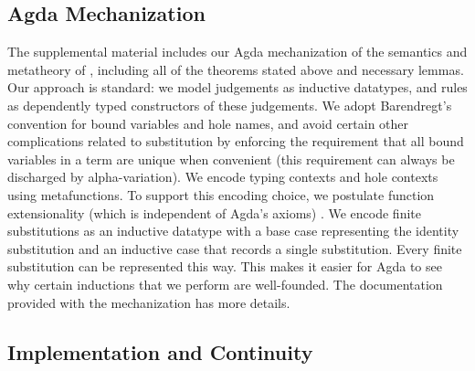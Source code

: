 
\vspace{-3px}
\subsection{Agda Mechanization}
\label{sec:agda-mechanization}
\vspace{-2px}

The supplemental material includes our Agda
mechanization  \cite{norell2009dependently,norell:thesis,Aydemir:2005fk}
of the semantics and metatheory of \HazelnutLive,
including all of the theorems stated above and necessary lemmas.
%
%
%
%
%
Our approach is standard: we model judgements as
inductive datatypes, and rules as dependently typed constructors of these judgements.
%
We adopt Barendregt's convention for bound variables \cite{urban,barendregt84:_lambda_calculus} and hole names, and avoid certain other complications related to substitution by enforcing the requirement that all bound variables in a term are unique when convenient (this requirement can always be discharged by alpha-variation). We encode typing
contexts and hole contexts using metafunctions.
To support this encoding choice, we postulate function extensionality (which is independent of Agda's axioms) \cite{awodey2012inductive}. We encode finite substitutions as an inductive datatype with a base case representing the identity substitution and an inductive case that records a single substitution. Every finite substitution can be represented this way. This makes it easier for Agda to see why certain inductions that we perform are well-founded.  
The documentation provided with the mechanization has more details.

\vspace{-3px}
\subsection{Implementation and Continuity}\label{sec:implementation}
\vspace{-2px}

